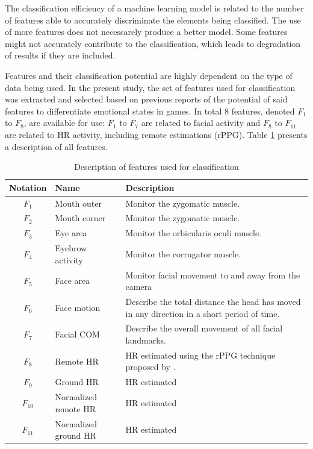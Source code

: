 The classification efficiency of a machine learning model is related to the number of features able to accurately discriminate the elements being classified. The use of more features does not necessarely produce a better model. Some features might not accurately contribute to the classification, which leads to degradation of results if they are included.

Features and their classification potential are highly dependent on the type of data being used. In the present study, the set of features used for classification was extracted and selected based on previous reports of the potential of said features to differentiate emotional states in games. In total 8 features, denoted $F_1$ to $F_8$, are available for use: $F_1$ to $F_7$ are related to facial activity and $F_8$ to $F_11$ are related to HR activity, including remote estimations (rPPG). Table \ref{table:study5-features-list} presents a description of all features.

\begin{table}
    \centering
    \caption{Description of features used for classification}
    \label{table:study5-features-list}
    \begin{tabular}[l]{@{}clp{6.5cm}}
        \hline
            \textbf{Notation} & \textbf{Name} & \textbf{Description} \\
        \hline
            $F_1$ & Mouth outer & Monitor the zygomatic muscle.  \\
            $F_2$ & Mouth corner & Monitor the zygomatic muscle. \\
            $F_3$ & Eye area & Monitor the orbicularis oculi muscle. \\
            $F_4$ & Eyebrow activity & Monitor the corrugator muscle.  \\
            $F_5$ & Face area & Monitor facial movement to and away from the camera  \\
            $F_6$ & Face motion & Describe the total distance the head has moved in any direction in a short period of time.  \\
            $F_7$ & Facial COM & Describe the overall movement of all facial landmarks. \\
            $F_8$ & Remote HR & HR estimated using the rPPG technique proposed by \textcite{poh2011advancements}.  \\
            $F_9$ & Ground HR & HR estimated   \\
            $F_10$ & Normalized remote HR & HR estimated   \\
            $F_11$ & Normalized ground HR & HR estimated   \\
        \hline
    \end{tabular}
\end{table}

